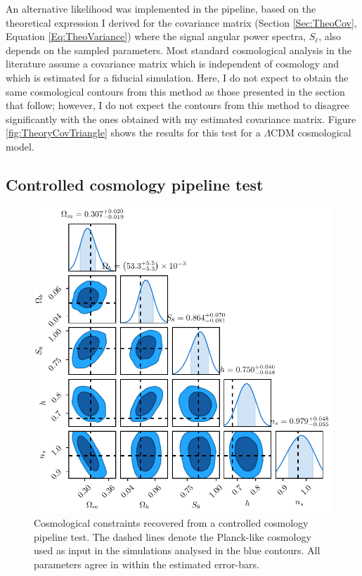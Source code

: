 An alternative likelihood was implemented in the \uclcl pipeline, based on the theoretical expression I derived for the covariance matrix (Section \ref{Sec:TheoCov}, Equation \eqref{Eq:TheoVariance}) where the signal angular power spectra, $S_{\ell}$, also depends on the sampled parameters. Most standard cosmological analysis in the literature \citep{2016BOSSCosmology,2017arXiv170801530D,2017MNRAS.465.1454H} assume a covariance matrix which is independent of cosmology and which is estimated for a fiducial simulation. Here, I do not expect to obtain the same cosmological contours from this method as those presented in the section that follow; however, I do not expect the contours from this method to disagree significantly with the ones obtained with my estimated covariance matrix. Figure \ref{fig:TheoryCovTriangle} shows the results for this test for a $\Lambda$CDM cosmological model. 

\subsection{Controlled cosmology pipeline test}\label{Sec:ConsistControl}
\begin{figure}
\begin{center}
\includegraphics[scale=0.85]{BOSS-FIGS/Controlled_PipelineTest.pdf}
\caption[Cosmological constraints recovered from a controlled cosmology pipeline test.]{Cosmological constraints recovered from a controlled cosmology pipeline test. The dashed lines denote the Planck-like cosmology used as input in the simulations analysed in the blue contours. All parameters agree in within the estimated error-bars.}
\label{fig:Controlledtest}
\end{center}
\end{figure}

